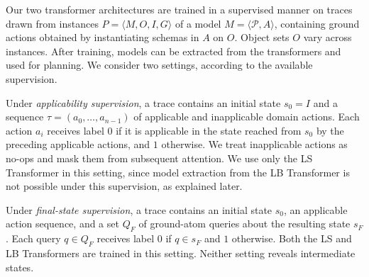 \label{sec:learning-task}
Our two transformer architectures are trained in a supervised manner on traces drawn from instances $P=\langle M,O,I,G\rangle$ of a \strips model $M=\langle\mathcal{P},A\rangle$, containing ground actions obtained by instantiating schemas in $A$ on $O$. Object sets $O$ vary across instances.
After training, \strips models can be extracted from the transformers and used for planning. We consider two settings, according to the available supervision.

Under \emph{applicability supervision}, a trace contains an initial state $s_0=I$ and a sequence $\tau=(a_0,\ldots,a_{n-1})$ of applicable and inapplicable domain actions. Each action $a_i$ receives label $0$ if it is applicable in the state reached from $s_0$ by the preceding applicable actions, and $1$ otherwise. We treat inapplicable actions as no-ops and mask them from subsequent attention. We use only the LS Transformer in this setting, since model extraction from the LB Transformer is not possible under this supervision, as explained later.


Under \emph{final-state supervision}, a trace contains an initial state $s_0$, an applicable action sequence, and a set $Q_F$ of ground-atom queries about the resulting state $s_F$. Each query $q\in Q_F$ receives label $0$ if $q\in s_F$ and $1$ otherwise. Both the LS and LB Transformers are trained in this setting. Neither setting reveals intermediate states.


